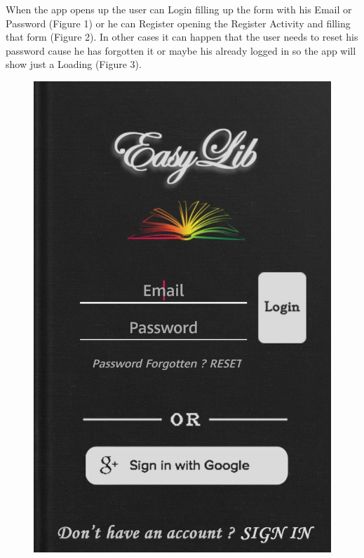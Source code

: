\vspace{5mm}
When the app opens up the user can Login filling up the form with his Email or Password (Figure 1) or he can Register opening the Register Activity and filling that form (Figure 2). In other cases it can happen that the user needs to reset his password cause he has forgotten it or maybe his already logged in so the app will show just a Loading (Figure 3).
\begin{figure}[H]
	\centering
	\includegraphics[scale=0.15]{Images/UI/Login_Register/1}
	\hspace{0.5cm}

\end{figure}
